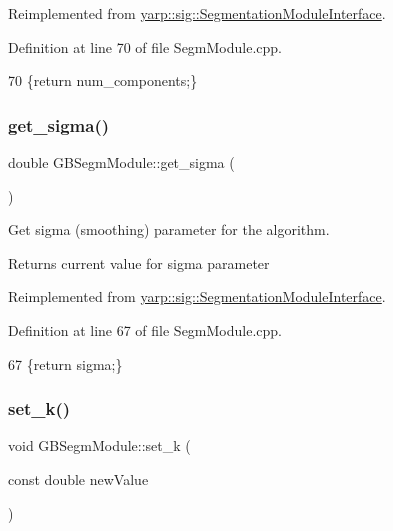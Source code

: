 Reimplemented from \hyperlink{classyarp_1_1sig_1_1SegmentationModuleInterface_a3c6b695fbef9e6827e7dd6b4cbbc38fe}{yarp\+::sig\+::\+Segmentation\+Module\+Interface}.



Definition at line 70 of file Segm\+Module.\+cpp.


\begin{DoxyCode}
70 \{\textcolor{keywordflow}{return} num\_components;\}
\end{DoxyCode}
\mbox{\label{classGBSegmModule_ae32ae1b1461e19c3a1b2f429c729ed03}} 
\subsubsection{\texorpdfstring{get\+\_\+sigma()}{get\_sigma()}}
{\footnotesize\ttfamily double G\+B\+Segm\+Module\+::get\+\_\+sigma (\begin{DoxyParamCaption}{ }\end{DoxyParamCaption})\hspace{0.3cm}{\ttfamily [virtual]}}



Get sigma (smoothing) parameter for the algorithm. 

\begin{DoxyReturn}{Returns}
current value for sigma parameter 
\end{DoxyReturn}


Reimplemented from \hyperlink{classyarp_1_1sig_1_1SegmentationModuleInterface_a38431f2c63d7da8ebf20adf0ed1da4fe}{yarp\+::sig\+::\+Segmentation\+Module\+Interface}.



Definition at line 67 of file Segm\+Module.\+cpp.


\begin{DoxyCode}
67 \{\textcolor{keywordflow}{return} sigma;\}
\end{DoxyCode}
\mbox{\label{classGBSegmModule_a15129913273e221a46c428f697e40575}} 
\subsubsection{\texorpdfstring{set\+\_\+k()}{set\_k()}}
{\footnotesize\ttfamily void G\+B\+Segm\+Module\+::set\+\_\+k (\begin{DoxyParamCaption}\item[{const double}]{new\+Value }\end{DoxyParamCaption})\hspace{0.3cm}{\ttfamily [virtual]}}



